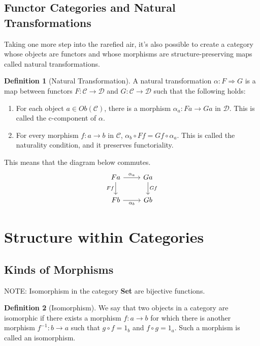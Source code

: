 \documentclass{article}
\theoremstyle{definition}
\newtheorem{definition}{Definition}
\begin{document}
\subsection*{Functor Categories and Natural Transformations}
Taking one more step into the rarefied air, it's also possible to create a category whose objects are functors and whose morphisms are structure-preserving maps called natural transformations.
\begin{definition}[Natural Transformation]
    A natural transformation $\alpha :F\Rightarrow G$ is a map between functors $F:\mathcal{C}\rightarrow\mathcal{D}$ and $G:\mathcal{C}\rightarrow\mathcal{D}$ such that the following holds:
    \begin{enumerate}
        \item For each object $a \in Ob(\mathcal{C})$, there is a morphism $\alpha_a:Fa\rightarrow Ga$ in $\mathcal{D}$. This is called the c-component of $\alpha$.
        \item For every morphism $f:a\rightarrow b$ in $\mathcal{C}$, $\alpha_b\circ Ff=Gf\circ\alpha_a$. This is called the naturality condition, and it preserves functoriality.
    \end{enumerate}
    \color{blue}
    This means that the diagram below commutes.
    \[\begin{tikzcd}
            Fa & Ga \\
            Fb & Gb
            \arrow["{\alpha_a}", from=1-1, to=1-2]
            \arrow["Ff"', from=1-1, to=2-1]
            \arrow["Gf", from=1-2, to=2-2]
            \arrow["{\alpha_b}"', from=2-1, to=2-2]
        \end{tikzcd}\]
    \color{black}
\end{definition}

\section*{Structure within Categories}
\subsection*{Kinds of Morphisms}

NOTE: Isomorphism in the category \textbf{Set} are bijective functions.
\begin{definition}[Isomorphism]
    We say that two objects in a category are isomorphic if there exists a morphism $f:a\rightarrow b$ for which there is another morphism $f^{-1}:b\rightarrow a$ such that $g\circ f=1_b$ and $f\circ g=1_a$.
    Such a morphism is called an isomorphism.
\end{definition}
\end{document}
